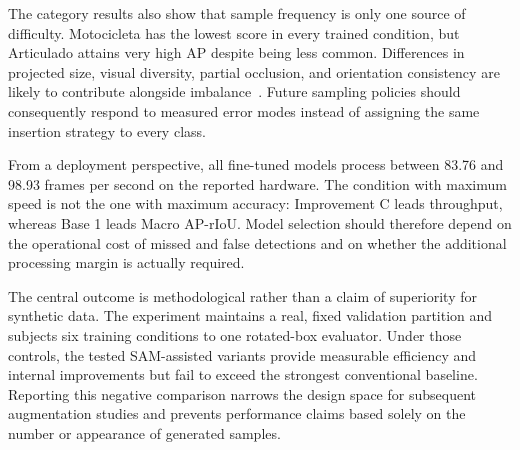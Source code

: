 The category results also show that sample frequency is only one source of difficulty. Motocicleta has the lowest score in every trained condition, but Articulado attains very high AP despite being less common. Differences in projected size, visual diversity, partial occlusion, and orientation consistency are likely to contribute alongside imbalance~\cite{Espinosa2020,Cheng2023SmallObjectSurvey,Nikouei2025SmallObjectSurvey}. Future sampling policies should consequently respond to measured error modes instead of assigning the same insertion strategy to every class.

From a deployment perspective, all fine-tuned models process between 83.76 and 98.93 frames per second on the reported hardware. The condition with maximum speed is not the one with maximum accuracy: Improvement C leads throughput, whereas Base 1 leads Macro AP-rIoU. Model selection should therefore depend on the operational cost of missed and false detections and on whether the additional processing margin is actually required.

The central outcome is methodological rather than a claim of superiority for synthetic data. The experiment maintains a real, fixed validation partition and subjects six training conditions to one rotated-box evaluator. Under those controls, the tested SAM-assisted variants provide measurable efficiency and internal improvements but fail to exceed the strongest conventional baseline. Reporting this negative comparison narrows the design space for subsequent augmentation studies and prevents performance claims based solely on the number or appearance of generated samples.
